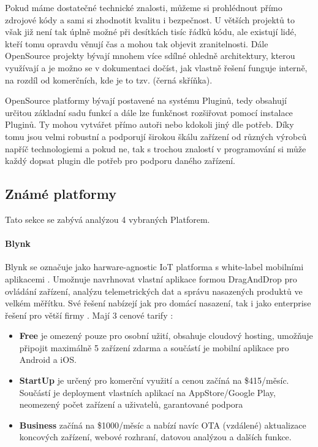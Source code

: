 Pokud máme dostatečné technické znalosti, můžeme si prohlédnout přímo zdrojové kódy a sami si zhodnotit kvalitu i bezpečnost. U větších projektů to však již není tak úplně možné při desítkách tisíc řádků kódu, ale existují lidé, kteří tomu opravdu věnují čas a mohou tak objevit zranitelnosti. Dále OpenSource projekty bývají mnohem více sdílné ohledně architektury, kterou využívají a je možno se v dokumentaci dočíst, jak vlastně řešení funguje interně, na rozdíl od komerčních, kde je to tzv.  (černá skříňka).

OpenSource platformy bývají postavené na systému Pluginů, tedy obsahují určitou základní sadu funkcí a dále lze funkčnost rozšiřovat pomocí instalace Pluginů. Ty mohou vytvářet přímo autoři nebo kdokoli jiný dle potřeb. Díky tomu jsou velmi robustní a podporují širokou škálu zařízení od různých výrobců napříč technologiemi a pokud ne, tak s trochou znalostí v programování si může každý dopsat plugin dle potřeb pro podporu daného zařízení.


\subsection{Známé platformy}
Tato sekce se zabývá analýzou 4 vybraných Platforem.

\paragraph{Blynk}
Blynk se označuje jako harware-agnostic IoT platforma s white-label mobilními aplikacemi \cite{blynk}. Umožnuje navrhnovat vlastní aplikace formou DragAndDrop pro ovládání zařízení, analýzu telemetrických dat a správu nasazených produktů ve velkém měřítku. Své řešení nabízejí jak pro domácí nasazení, tak i jako enterprise řešení pro větší firmy \cite{blynk}. Mají 3 cenové tarify \cite{blynk-pricing}:
\begin{itemize}
    \item \textbf{Free} je omezený pouze pro osobní užití, obsahuje cloudový hosting, umožňuje připojit maximálně 5 zařízení zdarma a součástí je mobilní aplikace pro Android a iOS.
    \item \textbf{StartUp} je určený pro komerční využití a cenou začíná na \$415/měsíc. Součástí je deployment vlastních aplikací na AppStore/Google Play, neomezený počet zařízení a uživatelů, garantované podpora
    \item \textbf{Business} začíná na \$1000/měsíc a nabízí navíc OTA (vzdálené) aktualizace koncových zařízení, webové rozhraní, datovou analýzou a dalších funkce.
\end{itemize}

